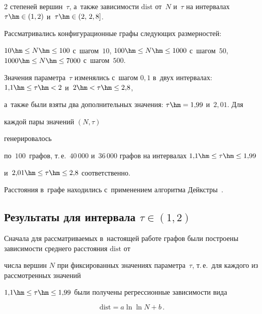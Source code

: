 \begin{multicols}{2}
степеней вершин~$\tau$, а~также зависимости $\mathrm{dist}$ от~$N$ и~$\tau$ на интервалах $\tau\hm\in(1,2)$ и~$\tau\hm\in(2,\,2,8]$.

Рассматривались конфигурационные графы сле\-ду\-ющих размерностей:

$10\hm\leq N\hm\leq 100$ с~шагом~$10$, $100\hm\leq N\hm\leq 1000$ с~шагом~$50$, $1000\hm\leq N\hm\leq 7000$ с~шагом~$500$.

Значения параметра~$\tau$ изменялись с~шагом $0{,}1$ в~двух интервалах: $1{,}1\hm\leq\tau\hm<2$ и~$2\hm<\tau\hm\leq 2{,}8$,

а~так\-же были взяты два дополнительных значения: $\tau\hm=1{,}99$ и~$2{,}01$. Для

каждой пары значений $(N,\tau)$

генерировалось\linebreak\vspace*{-12pt}



\pagebreak



\noindent

  по~$100$~графов, т.\,е.\ $40\,000$ и~$36\,000$ графов на интервалах $1{,}1\hm\leq\tau\hm\leq 1{,}99$

и~$2{,}01\hm\leq\tau\hm\leq 2{,}8$ соответственно.

Расстояния в~графе находились с~применением алгоритма Дейкстры~\cite{Dijk}.



\subsection{Результаты для интервала $\tau\in(1,2)$}



Сначала для рассматриваемых в~настоящей работе графов были по\-стро\-ены зависимости среднего рас\-сто\-яния $\mathrm{dist}$ от

чис\-ла вершин $N$ при фиксированных значениях па\-ра\-мет\-ра~$\tau$, т.\,е.\ для каждого из рас\-смот\-рен\-ных значений

$1{,}1\hm\leq\tau\hm\leq 1{,}99$ были получены регрессионные зависимости вида

\begin{equation}

\label{eq4}

\mathrm{dist} = a \ln\ln N + b\,.

\end{equation}


\end{multicols}
